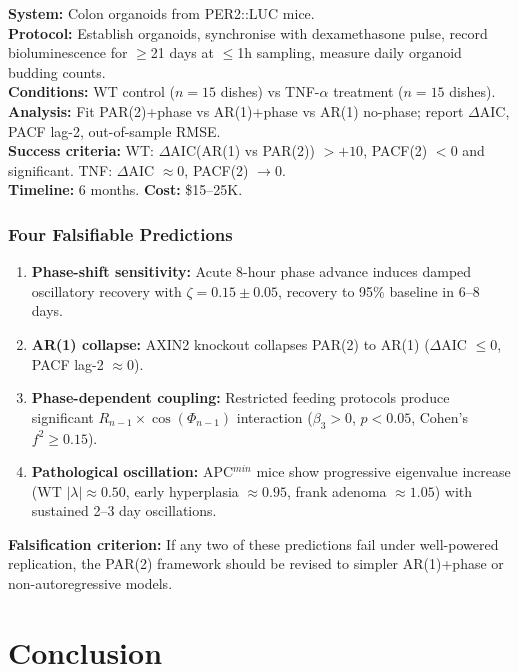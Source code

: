 \documentclass[11pt,letterpaper]{article}
\begin{document}
\textbf{System:} Colon organoids from PER2::LUC mice. \\
\textbf{Protocol:} Establish organoids, synchronise with dexamethasone pulse, record bioluminescence for $\geq$21 days at $\leq$1h sampling, measure daily organoid budding counts. \\
\textbf{Conditions:} WT control ($n = 15$ dishes) vs TNF-$\alpha$ treatment ($n = 15$ dishes). \\
\textbf{Analysis:} Fit PAR(2)+phase vs AR(1)+phase vs AR(1) no-phase; report $\Delta$AIC, PACF lag-2, out-of-sample RMSE. \\
\textbf{Success criteria:} WT: $\Delta$AIC(AR(1) vs PAR(2)) $> +10$, PACF(2) $< 0$ and significant. TNF: $\Delta$AIC $\approx 0$, PACF(2) $\to 0$. \\
\textbf{Timeline:} 6 months. \textbf{Cost:} \$15--25K.

\subsubsection{Four Falsifiable Predictions}

\begin{enumerate}
\item \textbf{Phase-shift sensitivity:} Acute 8-hour phase advance induces damped oscillatory recovery with $\zeta = 0.15 \pm 0.05$, recovery to 95\% baseline in 6--8 days.
\item \textbf{AR(1) collapse:} AXIN2 knockout collapses PAR(2) to AR(1) ($\Delta$AIC $\leq 0$, PACF lag-2 $\approx 0$).
\item \textbf{Phase-dependent coupling:} Restricted feeding protocols produce significant $R_{n-1} \times \cos(\Phi_{n-1})$ interaction ($\beta_3 > 0$, $p < 0.05$, Cohen's $f^2 \geq 0.15$).
\item \textbf{Pathological oscillation:} APC$^{min}$ mice show progressive eigenvalue increase (WT $|\lambda| \approx 0.50$, early hyperplasia $\approx 0.95$, frank adenoma $\approx 1.05$) with sustained 2--3 day oscillations.
\end{enumerate}

\textbf{Falsification criterion:} If any two of these predictions fail under well-powered replication, the PAR(2) framework should be revised to simpler AR(1)+phase or non-autoregressive models.


\section{Conclusion}
\end{document}
